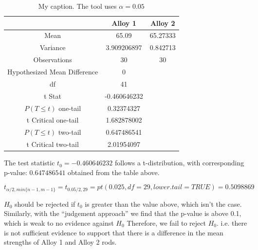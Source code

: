 \documentclass[letterpaper]{article}
\begin{document}
\begin{table}[H]
 \centering
 \begin{tabular}{c|c|c|}
                               & Alloy 1      & Alloy 2  \\ \hline
  Mean                         & 65.09        & 65.27333 \\ \hline
  Variance                     & 3.909206897  & 0.842713 \\ \hline
  Observations                 & 30           & 30       \\ \hline
  Hypothesized Mean Difference & 0            &          \\ \hline
  df                           & 41           &          \\ \hline
  t Stat                       & -0.460646232 &          \\ \hline
  $P(T \leq t)$ one-tail       & 0.32374327   &          \\ \hline
  t Critical one-tail          & 1.682878002  &          \\ \hline
  $P(T \leq t)$ two-tail       & 0.647486541  &          \\ \hline
  t Critical two-tail          & 2.01954097   &          \\ \hline
 \end{tabular}
 \caption{My caption. The tool uses $\alpha = 0.05$}
 \label{5a}
\end{table}

The test statistic $t_0 = -0.460646232$ follows a t-distribution, with
corresponding p-value: $0.647486541$ obtained from the table above.

$$t_{\alpha/2, min\{n-1, m-1\}} = t_{0.05/2, 29} = pt(0.025, df=29, lower.tail=TRUE) = 0.5098869$$

$H_0$ should be rejected if $t_0$ is greater than the value above, which isn't
the case. Similarly, with the ``judgement approach'' we find that the p-value is
above 0.1, which is weak to no evidence against $H_0$ Therefore, we fail to
reject $H_0$. i.e. there is not sufficient evidence to support that there is a
difference in the mean strengths of Alloy 1 and Alloy 2 rods.

\subsection{}%
\end{document}
